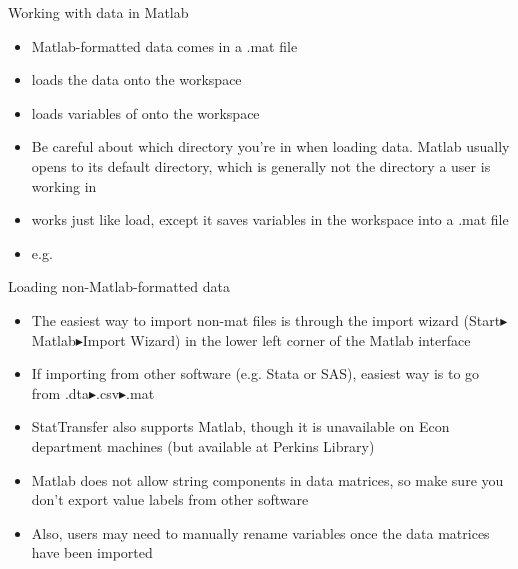 \documentclass[english,xcolor=dvipsnames]{beamer}
\begin{document}
\begin{frame}{Working with data in Matlab}
\begin{itemize}
	\item Matlab-formatted data comes in a .mat file
	\item {} loads the data onto the workspace
	\item {} loads variables  of  onto the workspace
	\item Be careful about which directory you're in when loading data. Matlab usually opens to its default directory, which is generally not the directory a user is working in
	\item {} works just like load, except it saves variables in the workspace into a .mat file
	\item e.g. 
\end{itemize}
\end{frame}

\begin{frame}{Loading non-Matlab-formatted data}
\begin{itemize}
	\item The easiest way to import non-mat files is through the import wizard (Start$\blacktriangleright$Matlab$\blacktriangleright$Import Wizard) in the lower left corner of the Matlab interface
	\item If importing from other software (e.g. Stata or SAS), easiest way is to go from .dta$\blacktriangleright$.csv$\blacktriangleright$.mat
	\item StatTransfer also supports Matlab, though it is unavailable on Econ department machines (but available at Perkins Library)
	\item Matlab does not allow string components in data matrices, so make sure you don't export value labels from other software
	\item Also, users may need to manually rename variables once the data matrices have been imported
\end{itemize}
\end{frame}
\end{document}
